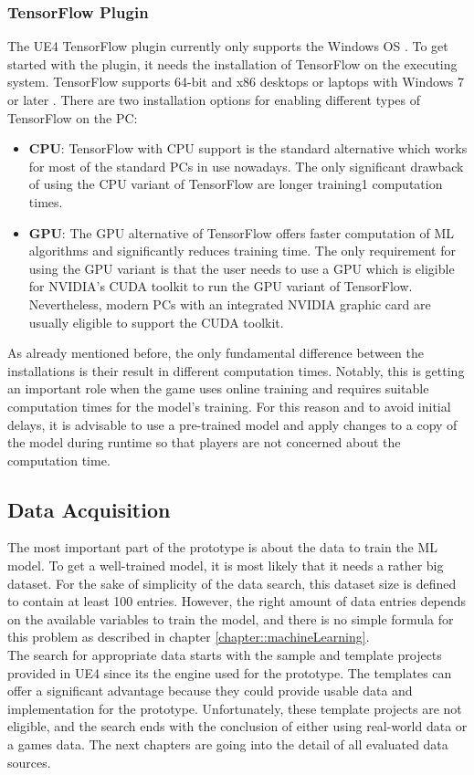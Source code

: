 \documentclass[MGS,Master,english]{twbook}%
\begin{document}
\subsubsection{TensorFlow Plugin}
The UE4 TensorFlow plugin currently only supports the Windows OS \cite{ue4::tensorFlowPlugin}. To get started with the plugin, it needs the installation of TensorFlow on the executing system. TensorFlow supports 64-bit and x86 desktops or laptops with Windows 7 or later \cite{api::tensorFlow}. There are two installation options for enabling different types of TensorFlow on the PC:
\begin{itemize}
	\item \textbf{\ac{CPU}}: TensorFlow with CPU support is the standard alternative which works for most of the standard PCs in use nowadays. The only significant drawback of using the CPU variant of TensorFlow are longer training1 computation times.
	\item \textbf{\ac{GPU}}: The GPU alternative of TensorFlow offers faster computation of ML algorithms and significantly reduces training time. The only requirement for using the GPU variant is that the user needs to use a GPU which is eligible for NVIDIA's CUDA toolkit \cite{nvidia::cudaToolkit} to run the GPU variant of TensorFlow. Nevertheless, modern PCs with an integrated NVIDIA graphic card are usually eligible to support the CUDA toolkit. 
\end{itemize}
As already mentioned before, the only fundamental difference between the installations is their result in different computation times. Notably, this is getting an important role when the game uses online training and requires suitable computation times for the model's training. For this reason and to avoid initial delays, it is advisable to use a pre-trained model and apply changes to a copy of the model during runtime so that players are not concerned about the computation time.

\subsection{Data Acquisition}
The most important part of the prototype is about the data to train the ML model. To get a well-trained model, it is most likely that it needs a rather big dataset. For the sake of simplicity of the data search, this dataset size is defined to contain at least 100 entries. However, the right amount of data entries depends on the available variables to train the model, and there is no simple formula for this problem as described in chapter \ref{chapter::machineLearning}. \\
The search for appropriate data starts with the sample and template projects provided in UE4 since its the engine used for the prototype. The templates can offer a significant advantage because they could provide usable data and implementation for the prototype. Unfortunately, these template projects are not eligible, and the search ends with the conclusion of either using real-world data or a games data. The next chapters are going into the detail of all evaluated data sources.
\end{document}
